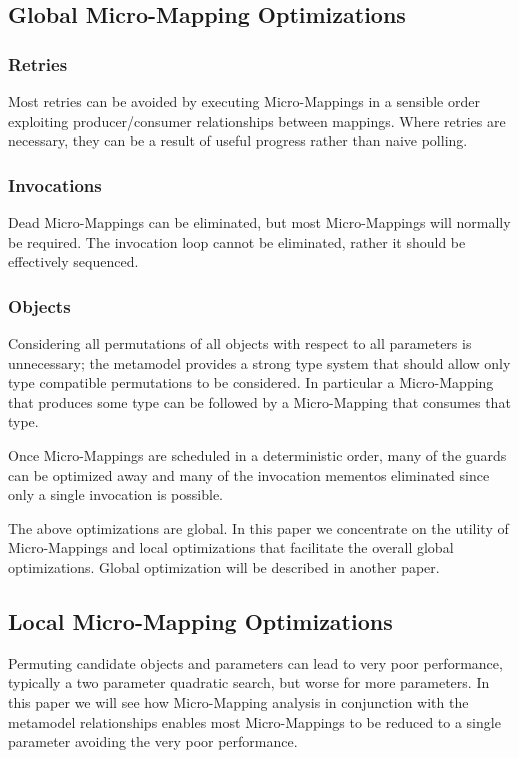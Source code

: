 \documentclass[conference]{IEEEtran}
\begin{document}
\subsection{Global Micro-Mapping Optimizations}\label{Global Micro-Mapping Optimizations}

\subsubsection{Retries}Most retries can be avoided by executing Micro-Mappings in a sensible order exploiting producer/consumer relationships between mappings. Where retries are necessary, they can be a result of useful progress rather than naive polling.

\subsubsection{Invocations}Dead Micro-Mappings can be eliminated, but most Micro-Mappings will normally be required. The invocation loop cannot be eliminated, rather it should be effectively sequenced.

\subsubsection{Objects}Considering all permutations of all objects with respect to all parameters is unnecessary; the metamodel provides a strong type system that should allow only type compatible permutations to be considered. In particular a Micro-Mapping that produces some type can be followed by a Micro-Mapping that consumes that type.

Once Micro-Mappings are scheduled in a deterministic order, many of the guards can be optimized away and many of the invocation mementos eliminated since only a single invocation is possible.

The above optimizations are global. In this paper we concentrate on the utility of Micro-Mappings and local optimizations that facilitate the overall global optimizations. Global optimization will be described in another paper.
  
\subsection{Local Micro-Mapping Optimizations}

Permuting candidate objects and parameters can lead to very poor performance, typically a two parameter quadratic search, but worse for more parameters. In this paper we will see how Micro-Mapping analysis in conjunction with the metamodel relationships enables most Micro-Mappings to be reduced to a single parameter avoiding the very poor performance. %
\end{document}
